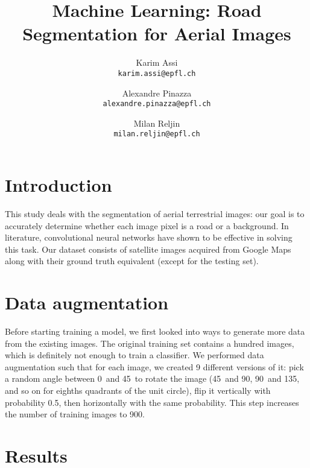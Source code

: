 \documentclass[10pt,conference,compsocconf]{IEEEtran}
\begin{document}
\title{Machine Learning: Road Segmentation for Aerial Images}
\author{
  Karim Assi\\
  \texttt{karim.assi@epfl.ch}
  \and
  Alexandre Pinazza\\
  \texttt{alexandre.pinazza@epfl.ch}
  \and
  Milan Reljin\\
  \texttt{milan.reljin@epfl.ch}
}

\maketitle

    

\section{Introduction}

This study deals with the segmentation of aerial terrestrial images: our goal is to accurately determine whether each image pixel is a road or a background. In literature, convolutional neural networks have shown to be effective in solving this task. %
Our dataset consists of satellite images acquired from Google Maps along with their ground truth equivalent (except for the testing set).

\section{Data augmentation}

Before starting training a model, we first looked into ways to generate more data from the existing images. The original training set contains a hundred images, which is definitely not enough to train a classifier. We performed data augmentation such that for each image, we created 9 different versions of it: pick a random angle between 0\textdegree\ and 45\textdegree\ to rotate the image (45\textdegree\ and 90\textdegree, 90\textdegree\  and 135\textdegree, and so on for eighths quadrants of the unit circle), flip it vertically with probability 0.5, then horizontally with the same probability. This step increases the number of training images to 900. 

\section{Results}
\end{document}
